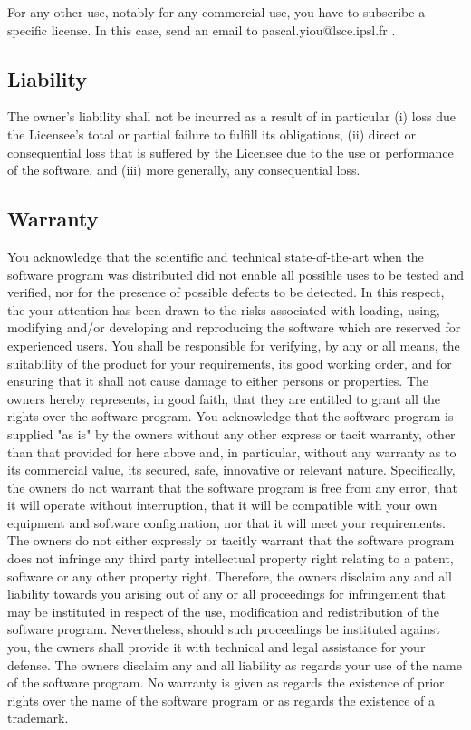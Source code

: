 \documentclass[11p,a4paper]{article}
\begin{document}
For any other use, notably for any commercial use, you have to subscribe a specific license. In this case, send an email to pascal.yiou@lsce.ipsl.fr .

\subsection{Liability}
The owner’s liability shall not be incurred as a result of in particular (i) loss due the Licensee's total or partial failure to fulfill its obligations, (ii) direct or consequential loss that is suffered by the Licensee due to the use or performance of the software, and (iii) more generally, any consequential loss. 

\subsection{Warranty}
You acknowledge that the scientific and technical state-of-the-art when the software program was distributed did not enable all possible uses to be tested and verified, nor for the presence of possible defects to be detected. In this respect, the your attention has been drawn to the risks associated with loading, using, modifying and/or developing and reproducing the software which are reserved for experienced users.
You shall be responsible for verifying, by any or all means, the suitability of the product for your requirements, its good working order, and for ensuring that it shall not cause damage to either persons or properties.
The owners hereby represents, in good faith, that they are entitled to grant all the rights over the software program. You acknowledge that the software program is supplied "as is" by the owners without any other express or tacit warranty, other than that provided for here above and, in particular, without any warranty as to its commercial value, its secured, safe, innovative or relevant nature. Specifically, the owners do not warrant that the software program is free from any error, that it will operate without interruption, that it will be compatible with your own equipment and software configuration, nor that it will meet your requirements.
The owners do not either expressly or tacitly warrant that the
software program does not infringe any third party intellectual property right relating to a patent, software or any other property right. Therefore, the owners disclaim any and all liability towards you arising out of any or all proceedings for infringement that may be instituted in respect of the use, modification and redistribution of the software program. Nevertheless, should such proceedings be instituted against you, the owners shall provide it with technical and legal assistance for your defense. The owners disclaim any and all liability as regards your use of the name of the software program. No warranty is given as regards the existence of
prior rights over the name of the software program or as regards the existence of a trademark.



\end{document}
